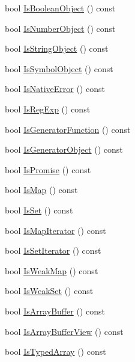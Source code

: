 \begin{DoxyCompactItemize}
\item 
bool \hyperlink{classv8_1_1Value_abe7bc06283e5e66013f2f056a943168b}{Is\+Boolean\+Object} () const 
\item 
bool \hyperlink{classv8_1_1Value_a5f4aa9504a6d8fc3af9489330179fe14}{Is\+Number\+Object} () const 
\item 
bool \hyperlink{classv8_1_1Value_a3e0f2727455fd01a39a60b92f77e28e0}{Is\+String\+Object} () const 
\item 
bool \hyperlink{classv8_1_1Value_a867baa94cb8f1069452359e6cef6751e}{Is\+Symbol\+Object} () const 
\item 
bool \hyperlink{classv8_1_1Value_a579fb52e893cdc24f8b77e5acc77d06d}{Is\+Native\+Error} () const 
\item 
bool \hyperlink{classv8_1_1Value_aae41e43486937d6122c297a0d43ac0b8}{Is\+Reg\+Exp} () const 
\item 
bool \hyperlink{classv8_1_1Value_a1cbbebde8c256d051c4606a7300870c6}{Is\+Generator\+Function} () const 
\item 
bool \hyperlink{classv8_1_1Value_a72982768acdadd82d1df02a452251d14}{Is\+Generator\+Object} () const 
\item 
bool \hyperlink{classv8_1_1Value_a93d6a0817b15a1d28050ba16e131e6b4}{Is\+Promise} () const 
\item 
bool \hyperlink{classv8_1_1Value_a71ef50f22d6bb4a093cc931b3d981c08}{Is\+Map} () const 
\item 
bool \hyperlink{classv8_1_1Value_a220bd4056471ee1dda8ab9565517edd7}{Is\+Set} () const 
\item 
bool \hyperlink{classv8_1_1Value_af9c52a0668fa3260a0d12a2cdf895b4e}{Is\+Map\+Iterator} () const 
\item 
bool \hyperlink{classv8_1_1Value_addbae0104e07b990ee1af0bd7927824b}{Is\+Set\+Iterator} () const 
\item 
bool \hyperlink{classv8_1_1Value_aab0297b39ed8e2a71b5dca7950228a36}{Is\+Weak\+Map} () const 
\item 
bool \hyperlink{classv8_1_1Value_a6f5a238206cbd95f98e2da92cab72e80}{Is\+Weak\+Set} () const 
\item 
bool \hyperlink{classv8_1_1Value_a65f9dad740f2468b44dc16349611c351}{Is\+Array\+Buffer} () const 
\item 
bool \hyperlink{classv8_1_1Value_ad54475d15b7e6b6e17fc80fb4570cdf2}{Is\+Array\+Buffer\+View} () const 
\item 
bool \hyperlink{classv8_1_1Value_ac2f2f6c39f14a39fbb5b43577125dfe4}{Is\+Typed\+Array} () const 
\item 

\end{DoxyCompactItemize}
